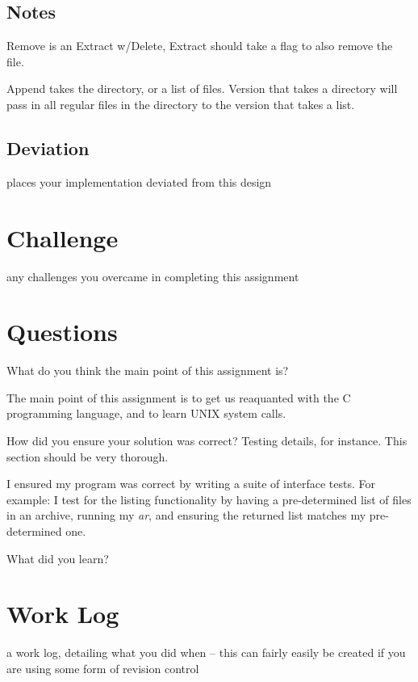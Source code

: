 \documentclass[letterpaper,10pt]{article}
\begin{document}
\subsection{Notes}
    Remove is an Extract w/Delete, Extract should take a flag to also remove
    the file.

    Append takes the directory, or a list of files. Version that takes a
    directory will pass in all regular files in the directory to the version
    that takes a list.

\subsection{Deviation}
    places your implementation deviated from this design

\section{Challenge}
    any challenges you overcame in completing this assignment

\section{Questions}
\begin{description}
  \item  What do you think the main point of this assignment is?

         The main point of this assignment is to get us reaquanted with
         the C programming language, and to learn UNIX system calls.

  \item  How did you ensure your solution was correct? Testing details, for
         instance. This section should be very thorough.

         I ensured my program was correct by writing a suite of
         interface tests. For example: I test for the listing
         functionality by having a pre-determined list of files in an
         archive, running my \emph{ar}, and ensuring the returned list
         matches my pre-determined one.

  \item  What did you learn?
\end{description}

\section{Work Log}
    a work log, detailing what you did when -- this can fairly easily be
    created if you are using some form of revision control
\end{document}
